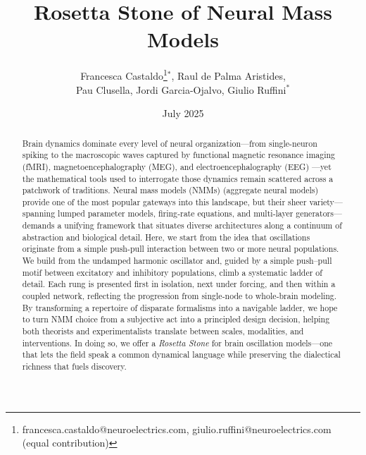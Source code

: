 \documentclass[11pt]{article}
\title{Rosetta Stone of Neural Mass Models \\ }
\author{Francesca Castaldo\thanks{francesca.castaldo@neuroelectrics.com, giulio.ruffini@neuroelectrics.com (equal contribution)}$^*$, Raul de Palma Aristides, \\Pau Clusella, Jordi Garcia-Ojalvo, Giulio Ruffini$^*$}
\date{July 2025}
\numberwithin{equation}{section}
\begin{document}
\maketitle

\begin{abstract}
    Brain dynamics dominate every level of neural organization—from single-neuron spiking to the macroscopic waves captured by functional magnetic resonance imaging (fMRI), magnetoencephalography (MEG), and electroencephalography (EEG) —yet the mathematical tools used to interrogate those dynamics remain scattered across a patchwork of traditions.
    Neural mass models (NMMs) (aggregate neural models) provide one of the most popular gateways into this landscape, but their sheer variety---spanning lumped parameter models, firing‐rate equations, and multi‐layer generators---demands a unifying framework that situates diverse architectures along a continuum of abstraction and biological detail. Here, we start from the idea that oscillations originate from a simple push-pull interaction between two or more neural populations. We build from the undamped harmonic oscillator and, guided by a simple push–pull motif between excitatory and inhibitory populations, climb a systematic ladder of detail.
    Each rung is presented first in isolation, next under forcing, and then within a coupled network, reflecting the progression from single‐node  to whole‐brain modeling. By transforming a repertoire of disparate formalisms into a navigable ladder, we hope to turn NMM choice from a subjective act into a principled design decision, helping both theorists and experimentalists translate between scales, modalities, and interventions. In doing so, we offer a \emph{Rosetta Stone} for brain oscillation models—one that lets the field speak a common dynamical language while preserving the dialectical richness that fuels discovery.
      
\end{abstract}


\clearpage
\end{document}
